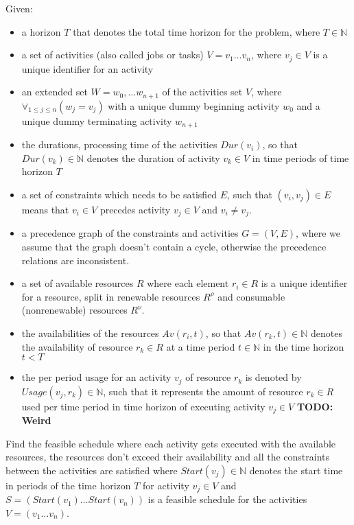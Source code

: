 \documentclass{article}
\newcommand{\TODO}[1]{{\color{red}\textbf{TODO: #1}}}
\newcommand{\renres}[0]{R^\rho} %
\newcommand{\conres}[0]{R^\nu} %
\newcommand{\av}[1]{\textit{Av}(#1)} %
\newcommand{\dur}[1]{\textit{Dur}(#1)} %
\newcommand{\usage}[1]{\textit{Usage}(#1)} %
\newcommand{\start}[1]{\textit{Start}(#1)} %
\begin{document}
Given:
\begin{itemize}
\item a horizon $T$ that denotes the total time horizon for the problem, where $T \in \mathbb{N}$
\item a set of activities (also called jobs or tasks) $V = v_1 \ldots v_n$, where $v_j \in V$ is a unique identifier for an activity
\item an extended set $W = w_0, \ldots w_{n+1}$ of the activities set $V$, where $\forall_{1 \leq j \leq n} (w_j = v_j)$ with a unique dummy beginning activity $w_0$ and a unique dummy terminating activity $w_{n+1}$
\item the durations, processing time of the activities $\dur{v_i}$, so that $\dur{v_k} \in \mathbb{N}$ denotes the duration of activity $v_k \in V$ in time periods of time horizon $T$
\item a set of constraints which needs to be satisfied $E$, such that $(v_i,v_j) \in E$ means that $v_i \in V$ precedes activity $v_j \in V$ and $v_i \neq v_j$.
\item a precedence graph of the constraints and activities $G = (V, E)$, where we assume that the graph doesn't contain a cycle, otherwise the precedence relations are inconsistent.
\item a set of available resources $R$ where each element $r_i \in R$ is a unique identifier for a resource, split in renewable resources $\renres$ and  consumable (nonrenewable) resources $\conres$.
\item the availabilities of the resources $\av{r_i, t}$, so that $\av{r_k, t} \in \mathbb{N}$ denotes the availability of resource $r_k \in R$ at a time period $t \in \mathbb{N}$ in the time horizon $t < T$
\item the per period usage for an activity $v_j$ of resource $r_k$ is denoted by $\usage{v_j, r_k} \in \mathbb{N}$, such that it represents the amount of resource $r_k \in R$ used per time period in time horizon of executing activity $v_j \in V$ \TODO{Weird}
\end{itemize}

Find the feasible schedule where each activity gets executed with the available resources, the resources don't exceed their availability and all the constraints between the activities are satisfied where $\start{v_j} \in \mathbb{N}$ denotes the start time in periods of the time horizon $T$ for activity $v_j \in V$ and
$S = (\start{v_1} \ldots \start{v_n})$ is a feasible schedule for the activities $V = (v_1 \ldots v_n)$.
\end{document}

